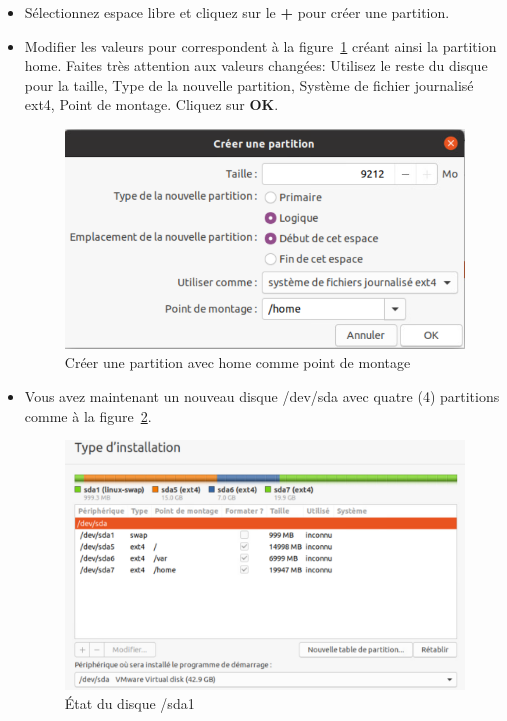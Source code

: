\begin{itemize}
		
		\item Sélectionnez espace libre et cliquez sur le  \textbf{+} pour créer une partition. 
		\item Modifier les valeurs pour correspondent à la figure~\ref{Fig15} créant ainsi la partition home. {\color{blue}Faites très attention aux valeurs changées}: Utilisez le reste du disque pour la taille, Type de la nouvelle partition, Système de fichier journalisé ext4, Point de montage. Cliquez sur\textbf{ OK}.
		
		
		\begin{figure}[!htb]
			\centering
			\caption{\label{Fig15}Créer une partition avec home comme point de montage}
			\includegraphics[scale=0.49]{images/Capture17}
		\end{figure}
		
		\item Vous avez maintenant un nouveau disque /dev/sda avec quatre (4) partitions comme à la figure~\ref{Fig16}.
		
		
		\begin{figure}[!htb]
			\centering
			\caption{\label{Fig16}État du disque /sda1}
			\includegraphics[scale=0.49]{images/Capture18}
		\end{figure}
		

\end{itemize}
